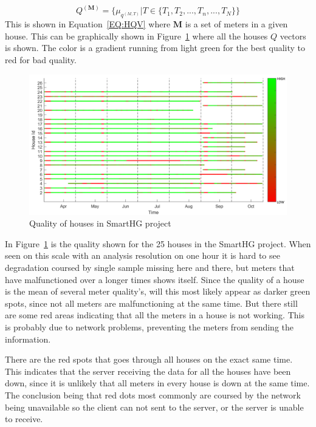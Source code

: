\begin{equation}
	Q^{(\mathbf{M})} = \{ \mu_{q^{(M,T)}} | T \in \{T_1, T_2, ... ,T_n,..., T_N  \} \}
	\label{EQ:HQV}
\end{equation}
This is shown in Equation~\ref{EQ:HQV} where $\mathbf{M}$ is a set of meters in a given house. This can be graphically shown in Figure~\ref{fig:SmartHGQuality} where all the houses $Q$ vectors is shown. The color is a gradient running from light green for the best quality to red for bad quality.
\begin{figure}[H]
\centering
\includegraphics[width=1\textwidth]{billeder/QualityBig.png}
\caption{Quality of houses in SmartHG project}
\label{fig:SmartHGQuality}
\end{figure} 

In Figure~\ref{fig:SmartHGQuality} is the  quality shown for the 25 houses in the SmartHG project. When seen on this scale with an analysis resolution on one hour it is hard to see degradation coursed by single sample missing here and there, but meters that have malfunctioned over a longer times shows itself. Since the quality of a house is the mean of several meter quality's, will this most likely appear as darker green spots, since not all meters are malfunctioning at the same time. But there still are some red areas indicating that all the meters in a house is not working. This is probably due to network problems, preventing the meters from sending the information.

There are the red spots that goes through all houses on the exact same time. This indicates that the server receiving the data for all the houses have been down, since it is unlikely that all meters in every house is down at the same time. The conclusion being that red dots most commonly are coursed by the network being unavailable so the client can not sent to the server, or the server is unable to receive. 

